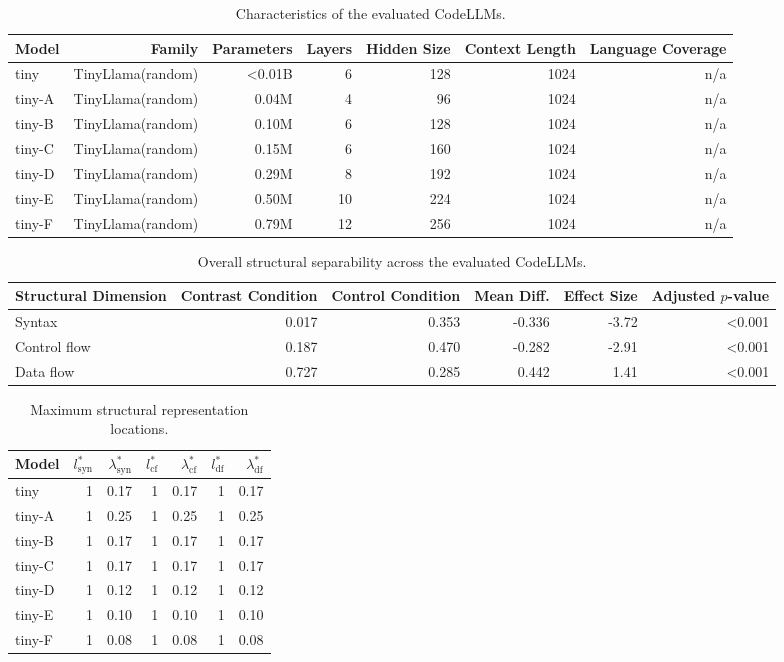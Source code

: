 \begin{table}[t]
\centering
\caption{Characteristics of the evaluated CodeLLMs.}
\label{tab:models}
\begin{tabular}{lrrrrrr}
\toprule
Model & Family & Parameters & Layers & Hidden Size & Context Length & Language Coverage \\
\midrule
tiny & TinyLlama(random) & \textless{}0.01B & 6 & 128 & 1024 & n/a \\
tiny-A & TinyLlama(random) & 0.04M & 4 & 96 & 1024 & n/a \\
tiny-B & TinyLlama(random) & 0.10M & 6 & 128 & 1024 & n/a \\
tiny-C & TinyLlama(random) & 0.15M & 6 & 160 & 1024 & n/a \\
tiny-D & TinyLlama(random) & 0.29M & 8 & 192 & 1024 & n/a \\
tiny-E & TinyLlama(random) & 0.50M & 10 & 224 & 1024 & n/a \\
tiny-F & TinyLlama(random) & 0.79M & 12 & 256 & 1024 & n/a \\
\bottomrule
\end{tabular}
\end{table}

\begin{table}[t]
\centering
\caption{Overall structural separability across the evaluated CodeLLMs.}
\label{tab:sep}
\begin{tabular}{lrrrrr}
\toprule
Structural Dimension & Contrast Condition & Control Condition & Mean Diff. & Effect Size & Adjusted $p$-value \\
\midrule
Syntax & 0.017 & 0.353 & -0.336 & -3.72 & \textless{}0.001 \\
Control flow & 0.187 & 0.470 & -0.282 & -2.91 & \textless{}0.001 \\
Data flow & 0.727 & 0.285 & 0.442 & 1.41 & \textless{}0.001 \\
\bottomrule
\end{tabular}
\end{table}

\begin{table}[t]
\centering
\caption{Maximum structural representation locations.}
\label{tab:peaks}
\begin{tabular}{lrrrrrr}
\toprule
Model & $l^{*}_{\mathrm{syn}}$ & $\lambda^{*}_{\mathrm{syn}}$ & $l^{*}_{\mathrm{cf}}$ & $\lambda^{*}_{\mathrm{cf}}$ & $l^{*}_{\mathrm{df}}$ & $\lambda^{*}_{\mathrm{df}}$ \\
\midrule
tiny & 1 & 0.17 & 1 & 0.17 & 1 & 0.17 \\
tiny-A & 1 & 0.25 & 1 & 0.25 & 1 & 0.25 \\
tiny-B & 1 & 0.17 & 1 & 0.17 & 1 & 0.17 \\
tiny-C & 1 & 0.17 & 1 & 0.17 & 1 & 0.17 \\
tiny-D & 1 & 0.12 & 1 & 0.12 & 1 & 0.12 \\
tiny-E & 1 & 0.10 & 1 & 0.10 & 1 & 0.10 \\
tiny-F & 1 & 0.08 & 1 & 0.08 & 1 & 0.08 \\
\bottomrule
\end{tabular}
\end{table}

